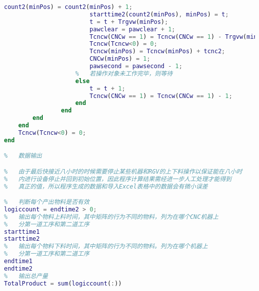 \documentclass[no-math,withoutpreface,bwprint]{cumcmthesis} %
\numberwithin{equation}{section}
\numberwithin{figure}{section}
\numberwithin{table}{section}
\begin{document}
\begin{lstlisting}[language=matlab]
                        count2(minPos) = count2(minPos) + 1;
                        starttime2(count2(minPos), minPos) = t;
                        t = t + Trgvw(minPos);
                        pawclear = pawclear + 1;
                        Tcncw(CNCw == 1) = Tcncw(CNCw == 1) - Trgvw(minPos);
                        Tcncw(Tcncw<0) = 0;
                        Tcncw(minPos) = Tcncw(minPos) + tcnc2;
                        CNCw(minPos) = 1;
                        pawsecond = pawsecond - 1;
                    %   若操作对象未工作完毕，则等待
                    else
                        t = t + 1;
                        Tcncw(CNCw == 1) = Tcncw(CNCw == 1) - 1;
                    end
                end
        end
    end
    Tcncw(Tcncw<0) = 0;
end    

%   数据输出

%   由于最后快接近八小时的时候需要停止某些机器和RGV的上下料操作以保证能在八小时
%   内进行设备停止并回到初始位置，因此程序计算结果需经进一步人工处理才能得到
%   真正的值，所以程序生成的数据和导入Excel表格中的数据会有微小误差

%   判断每个产出物料是否有效
logiccount = endtime2 > 0;
%   输出每个物料上料时间，其中矩阵的行为不同的物料，列为在哪个CNC机器上
%   分第一道工序和第二道工序
starttime1
starttime2
%   输出每个物料下料时间，其中矩阵的行为不同的物料。列为在哪个机器上
%   分第一道工序和第二道工序
endtime1
endtime2
%   输出总产量
TotalProduct = sum(logiccount(:))






\end{lstlisting}
\end{document}
